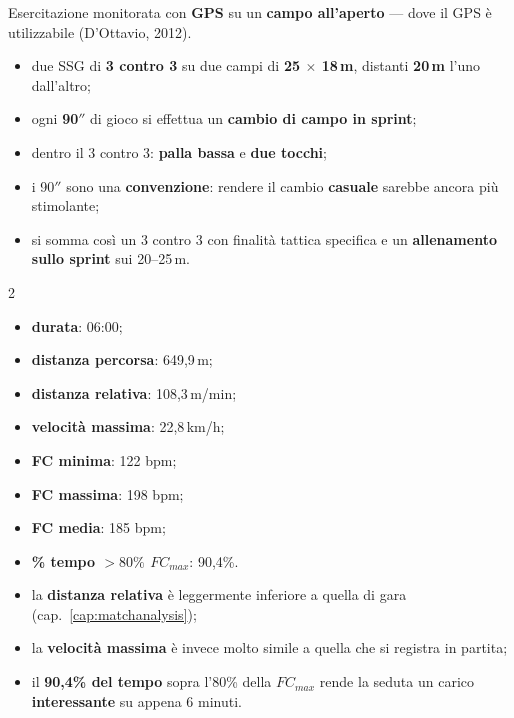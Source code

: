 Esercitazione monitorata con \textbf{GPS} su un \textbf{campo all'aperto} --- dove il GPS è
utilizzabile (D'Ottavio, 2012).

\begin{itemize}
  \item due SSG di \textbf{3 contro 3} su due campi di \textbf{25 $\times$ 18\,m}, distanti
    \textbf{20\,m} l'uno dall'altro;
  \item ogni \textbf{90$''$} di gioco si effettua un \textbf{cambio di campo in sprint};
  \item dentro il 3 contro 3: \textbf{palla bassa} e \textbf{due tocchi};
  \item i 90$''$ sono una \textbf{convenzione}: rendere il cambio \textbf{casuale} sarebbe ancora
    più stimolante;
  \item si somma così un 3 contro 3 con finalità tattica specifica e un \textbf{allenamento sullo
    sprint} sui 20--25\,m.
\end{itemize}

\begin{multicols}{2}
\begin{itemize}
  \item \textbf{durata}: 06:00;
  \item \textbf{distanza percorsa}: 649,9\,m;
  \item \textbf{distanza relativa}: 108,3\,m/min;
  \item \textbf{velocità massima}: 22,8\,km/h;
  \item \textbf{FC minima}: 122 bpm;
  \item \textbf{FC massima}: 198 bpm;
  \item \textbf{FC media}: 185 bpm;
  \item \textbf{\% tempo $> 80\%$ $FC_{max}$}: 90,4\%.
\end{itemize}
\end{multicols}

\begin{itemize}
  \item la \textbf{distanza relativa} è leggermente inferiore a quella di gara
    (cap.~\ref{cap:matchanalysis});
  \item la \textbf{velocità massima} è invece molto simile a quella che si registra in partita;
  \item il \textbf{90,4\% del tempo} sopra l'80\% della $FC_{max}$ rende la seduta un carico
    \textbf{interessante} su appena 6 minuti.
\end{itemize}

